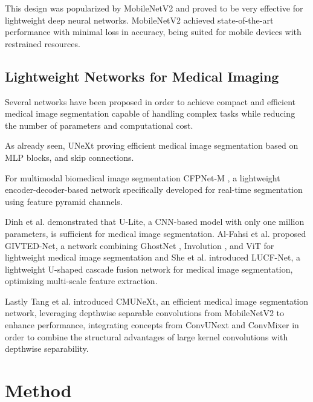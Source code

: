 \documentclass[lettersize,journal]{IEEEtran}
\begin{document}
This design was popularized by MobileNetV2 \cite{sandler2018mobilenetv2} and proved to be very effective for lightweight deep neural networks. MobileNetV2 achieved state-of-the-art performance with minimal loss in accuracy, being suited for mobile devices with restrained resources.


\subsection{Lightweight Networks for Medical Imaging} \label{subsec:lightweight}
Several networks have been proposed in order to achieve compact and efficient medical image segmentation capable of handling complex tasks while reducing the number of parameters and computational cost. 

As already seen, UNeXt proving efficient medical image segmentation based on MLP blocks, and skip connections.

For multimodal biomedical image segmentation CFPNet-M \cite{lou2023cfpnet}, a lightweight encoder-decoder-based network specifically developed for real-time segmentation using feature pyramid channels. 

Dinh et al. \cite{dinh20231m} demonstrated that U-Lite, a CNN-based model with only one million parameters, is sufficient for medical image segmentation. Al-Fahsi et al. \cite{al2024givted} proposed GIVTED-Net, a network combining GhostNet \cite{han2020ghostnet}, Involution \cite{li2021involution}, and ViT for lightweight medical image segmentation and She et al. \cite{she2024lucf} introduced LUCF-Net, a lightweight U-shaped cascade fusion network for medical image segmentation, optimizing multi-scale feature extraction.

Lastly Tang et al. \cite{tang2024cmunext} introduced CMUNeXt, an efficient medical image segmentation network, leveraging depthwise separable convolutions from MobileNetV2 to enhance performance, integrating concepts from ConvUNext \cite{han2022convunext} and ConvMixer \cite{tang2023cmu} in order to combine the structural advantages of large kernel convolutions with depthwise separability.



\section{Method}
\end{document}
